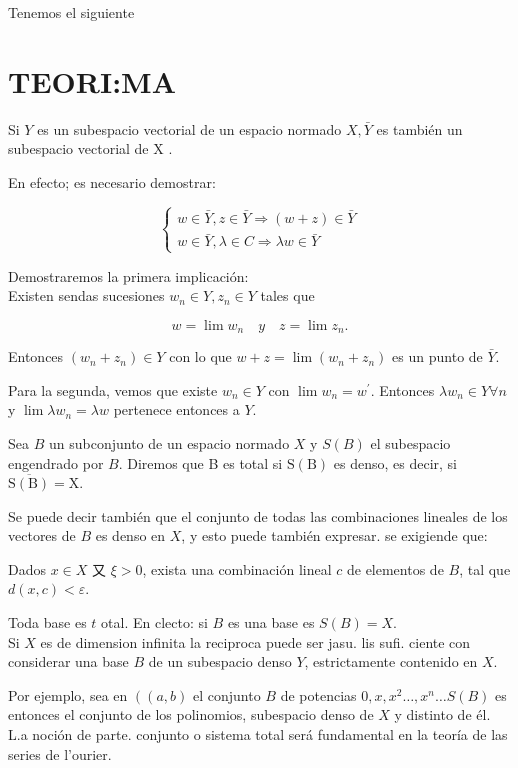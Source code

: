 \documentclass[10pt]{article}
\theoremstyle{plain}
\theoremstyle{definition}
\theoremstyle{remark}
\begin{document}
Tenemos el siguiente

\section*{TEORI:MA}
Si $Y$ es un subespacio vectorial de un espacio normado $X, \bar{Y}$ es también un subespacio vectorial de X .

En efecto; es necesario demostrar:

$$
\left\{\begin{array}{l}
w \in \bar{Y}, z \in \bar{Y} \Rightarrow(w+z) \in \bar{Y} \\
w \in \bar{Y}, \lambda \in C \Rightarrow \lambda w \in \bar{Y}
\end{array}\right.
$$

Demostraremos la primera implicación:\\
Existen sendas sucesiones $w_{n} \in Y, z_{n} \in Y$ tales que

$$
w=\lim w_{n} \quad y \quad z=\lim z_{n} .
$$

Entonces $\left(w_{n}+z_{n}\right) \in Y$ con lo que $w+z=\lim \left(w_{n}+z_{n}\right)$ es un punto de $\bar{Y}$.

Para la segunda, vemos que existe $w_{n} \in Y$ con $\lim w_{n}=w^{\prime}$. Entonces $\lambda w_{n} \in Y \forall n$ y $\lim \lambda w_{n}=\lambda w$ pertenece entonces a $Y$.

Sea $B$ un subconjunto de un espacio normado $X$ y $S(B)$ el subespacio engendrado por $B$. Diremos que B es total si $\mathrm{S}(\mathrm{B})$ es denso, es decir, si $\overline{\mathrm{S}(\mathrm{B})}=\mathrm{X}$.

Se puede decir también que el conjunto de todas las combinaciones lineales de los vectores de $B$ es denso en $X$, y esto puede también expresar. se exigiende que:

Dados $x \in X$ 又 $\xi>0$, exista una combinación lineal $c$ de elementos de $B$, tal que $d(x, c)<\varepsilon$.

Toda base es $t$ otal. En clecto: si $B$ es una base es $S(B)=X$.\\
Si $X$ es de dimension infinita la reciproca puede ser jasu. lis sufi. ciente con considerar una base $B$ de un subespacio denso $Y$, estrictamente contenido en $X$.

Por ejemplo, sea en $\left((a, b)\right.$ el conjunto $B$ de potencias $0, x, x^{2} \ldots, x^{n} \ldots S(B)$ es entonces el conjunto de los polinomios, subespacio denso de $X$ y distinto de él.\\
L.a noción de parte. conjunto o sistema total será fundamental en la teoría de las series de l'ourier.
\end{document}
